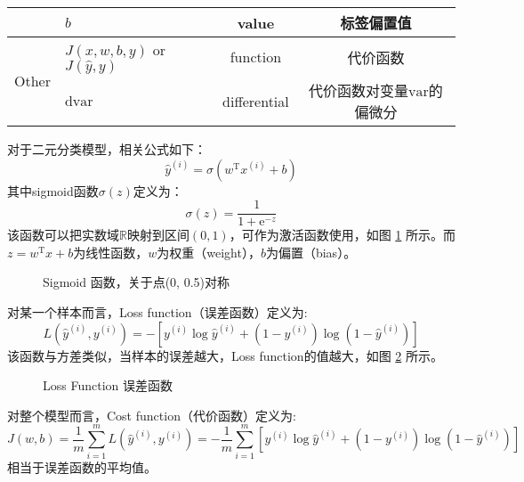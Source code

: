 \begin{table}[ht]
\begin{threeparttable}
\begin{tabular}{clcc}
									& $b$                                       & value                & 标签偏置值                                                            \\ \hline
		\multirow{2}{*}{Other}      & $J(x,w,b,y)$ or $J(\hat{y},y)$            & function             & 代价函数                                                               \\
									& $\mathrm{d}\mathrm{var}$                  & differential         & 代价函数对变量$\mathrm{var}$的偏微分                                    \\ \hline
	\end{tabular}
	\label{tab:notations_LR}
	\end{threeparttable}
\end{table}

对于二元分类模型，相关公式如下：
\begin{equation}
	\hat{y}^{(i)} = \sigma(w^\mathrm{T} x^{(i)} + b) \label{eq:logistic}
\end{equation}
其中sigmoid函数$\sigma(z)$定义为：
\begin{equation}
	\sigma(z) = \frac{1}{1 + \mathrm{e}^{-z}} \label{eq:sigmoid}
\end{equation}
该函数可以把实数域$\mathbb{R}$映射到区间$(0, 1)$，可作为激活函数使用，如图 \ref{fig:sigmoid} 所示。而$z = w^\mathrm{T} x + b$为线性函数，$w$为权重（weight），$b$为偏置（bias）。
\begin{figure}[h!b]
	\centering
	
	\caption{Sigmoid 函数，关于点(0, 0.5)对称}
	\label{fig:sigmoid}
\end{figure}

\vspace{0.5\baselineskip}
对某一个样本而言，Loss function（误差函数）定义为:
\begin{equation}
	L(\hat{y}^{(i)}, y^{(i)}) = -\left[y^{(i)} \log \hat{y}^{(i)} + (1 - y^{(i)}) \log (1 - \hat{y}^{(i)})\right] \label{eq:loss}
\end{equation}
该函数与方差类似，当样本的误差越大，Loss function的值越大，如图 \ref{fig:loss} 所示。
\begin{figure}[h!b]
	\centering
	
	\caption{Loss Function 误差函数}
	\label{fig:loss}
\end{figure}

对整个模型而言，Cost function（代价函数）定义为:
\begin{equation}
	J(w, b) = \frac{1}{m} \sum_{i=1}^{m} L(\hat{y}^{(i)}, y^{(i)}) = -\frac{1}{m} \sum_{i=1}^{m} \left[y^{(i)} \log \hat{y}^{(i)} + (1 - y^{(i)}) \log (1 - \hat{y}^{(i)})\right] \label{eq:cost}
\end{equation}
相当于误差函数的平均值。

